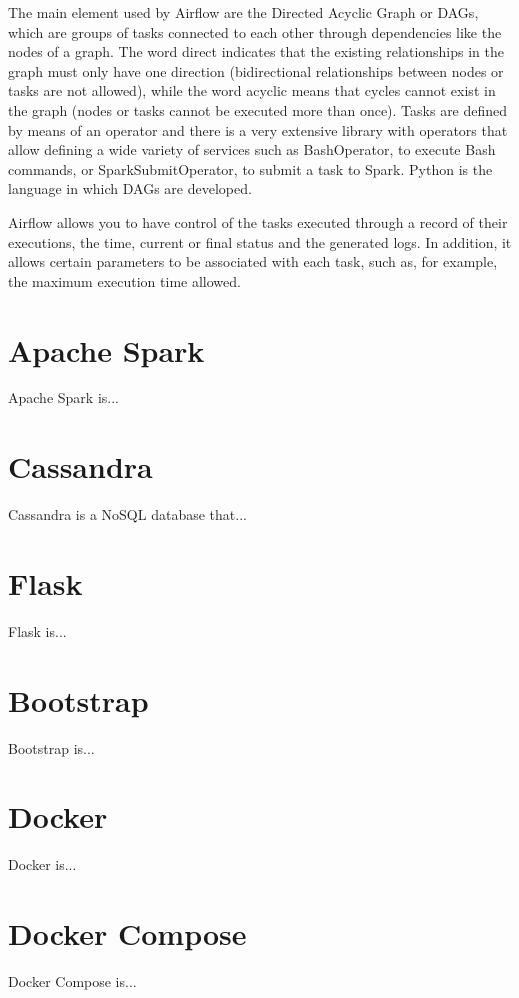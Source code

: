 \nonzeroparskip The main element used by Airflow are the Directed Acyclic Graph or DAGs, which are groups of tasks connected to each other through dependencies like the nodes of a graph. The word direct indicates that the existing relationships in the graph must only have one direction (bidirectional relationships between nodes or tasks are not allowed), while the word acyclic means that cycles cannot exist in the graph (nodes or tasks cannot be executed more than once). Tasks are defined by means of an operator and there is a very extensive library with operators that allow defining a wide variety of services such as BashOperator, to execute Bash commands, or SparkSubmitOperator, to submit a task to Spark. Python is the language in which DAGs are developed.

\nonzeroparskip Airflow allows you to have control of the tasks executed through a record of their executions, the time, current or final status and the generated logs. In addition, it allows certain parameters to be associated with each task, such as, for example, the maximum execution time allowed.

\section{Apache Spark}

\nonzeroparskip Apache Spark is...

\section{Cassandra}

\nonzeroparskip Cassandra is a NoSQL database that...

\section{Flask}

\nonzeroparskip Flask is...

\section{Bootstrap}

\nonzeroparskip Bootstrap is...

\section{Docker}

\nonzeroparskip Docker is...

\section{Docker Compose}

\nonzeroparskip Docker Compose is...
